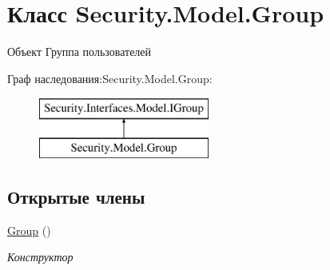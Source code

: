 \hypertarget{class_security_1_1_model_1_1_group}{}\section{Класс Security.\+Model.\+Group}
\label{class_security_1_1_model_1_1_group}


Объект Группа пользователей  


Граф наследования\+:Security.\+Model.\+Group\+:\begin{figure}[H]
\begin{center}
\leavevmode
\includegraphics[height=2.000000cm]{df/d0e/class_security_1_1_model_1_1_group}
\end{center}
\end{figure}
\subsection*{Открытые члены}
\begin{DoxyCompactItemize}
\item 
\hyperlink{class_security_1_1_model_1_1_group_a6719c42720c93905440e421714cd63ca}{Group} ()
\begin{DoxyCompactList}\small\item\em Конструктор \end{DoxyCompactList}\end{DoxyCompactItemize}
